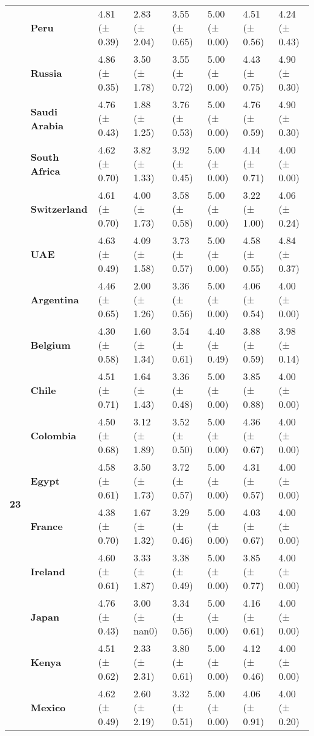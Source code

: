 \begin{longtable}{llllllll}
\textbf{} & \textbf{Peru} & 4.81 (± 0.39) & 2.83 (± 2.04) & 3.55 (± 0.65) & 5.00 (± 0.00) & 4.51 (± 0.56) & 4.24 (± 0.43) \\
\textbf{} & \textbf{Russia} & 4.86 (± 0.35) & 3.50 (± 1.78) & 3.55 (± 0.72) & 5.00 (± 0.00) & 4.43 (± 0.75) & 4.90 (± 0.30) \\
\textbf{} & \textbf{Saudi Arabia} & 4.76 (± 0.43) & 1.88 (± 1.25) & 3.76 (± 0.53) & 5.00 (± 0.00) & 4.76 (± 0.59) & 4.90 (± 0.30) \\
\textbf{} & \textbf{South Africa} & 4.62 (± 0.70) & 3.82 (± 1.33) & 3.92 (± 0.45) & 5.00 (± 0.00) & 4.14 (± 0.71) & 4.00 (± 0.00) \\
\textbf{} & \textbf{Switzerland} & 4.61 (± 0.70) & 4.00 (± 1.73) & 3.58 (± 0.58) & 5.00 (± 0.00) & 3.22 (± 1.00) & 4.06 (± 0.24) \\
\textbf{} & \textbf{UAE} & 4.63 (± 0.49) & 4.09 (± 1.58) & 3.73 (± 0.57) & 5.00 (± 0.00) & 4.58 (± 0.55) & 4.84 (± 0.37) \\
\cline{1-8}
\multirow[t]{19}{*}{\textbf{23}} & \textbf{Argentina} & 4.46 (± 0.65) & 2.00 (± 1.26) & 3.36 (± 0.56) & 5.00 (± 0.00) & 4.06 (± 0.54) & 4.00 (± 0.00) \\
\textbf{} & \textbf{Belgium} & 4.30 (± 0.58) & 1.60 (± 1.34) & 3.54 (± 0.61) & 4.40 (± 0.49) & 3.88 (± 0.59) & 3.98 (± 0.14) \\
\textbf{} & \textbf{Chile} & 4.51 (± 0.71) & 1.64 (± 1.43) & 3.36 (± 0.48) & 5.00 (± 0.00) & 3.85 (± 0.88) & 4.00 (± 0.00) \\
\textbf{} & \textbf{Colombia} & 4.50 (± 0.68) & 3.12 (± 1.89) & 3.52 (± 0.50) & 5.00 (± 0.00) & 4.36 (± 0.67) & 4.00 (± 0.00) \\
\textbf{} & \textbf{Egypt} & 4.58 (± 0.61) & 3.50 (± 1.73) & 3.72 (± 0.57) & 5.00 (± 0.00) & 4.31 (± 0.57) & 4.00 (± 0.00) \\
\textbf{} & \textbf{France} & 4.38 (± 0.70) & 1.67 (± 1.32) & 3.29 (± 0.46) & 5.00 (± 0.00) & 4.03 (± 0.67) & 4.00 (± 0.00) \\
\textbf{} & \textbf{Ireland} & 4.60 (± 0.61) & 3.33 (± 1.87) & 3.38 (± 0.49) & 5.00 (± 0.00) & 3.85 (± 0.77) & 4.00 (± 0.00) \\
\textbf{} & \textbf{Japan} & 4.76 (± 0.43) & 3.00 (± nan0) & 3.34 (± 0.56) & 5.00 (± 0.00) & 4.16 (± 0.61) & 4.00 (± 0.00) \\
\textbf{} & \textbf{Kenya} & 4.51 (± 0.62) & 2.33 (± 2.31) & 3.80 (± 0.61) & 5.00 (± 0.00) & 4.12 (± 0.46) & 4.00 (± 0.00) \\
\textbf{} & \textbf{Mexico} & 4.62 (± 0.49) & 2.60 (± 2.19) & 3.32 (± 0.51) & 5.00 (± 0.00) & 4.06 (± 0.91) & 4.00 (± 0.20) \\

\end{longtable}
